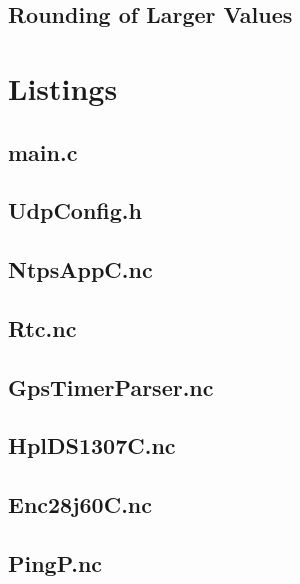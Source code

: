 \documentclass[12pt,a4paper,titlepage,oneside]{article}
\begin{document}
\subsection{Rounding of Larger Values}


\newpage
\appendix
\section{Listings}
\small{

\subsection{main.c}


\subsection{UdpConfig.h}


\subsection{NtpsAppC.nc}


\subsection{Rtc.nc}


\subsection{GpsTimerParser.nc}


\subsection{HplDS1307C.nc}


\subsection{Enc28j60C.nc}


\subsection{PingP.nc}


}
\end{document}
